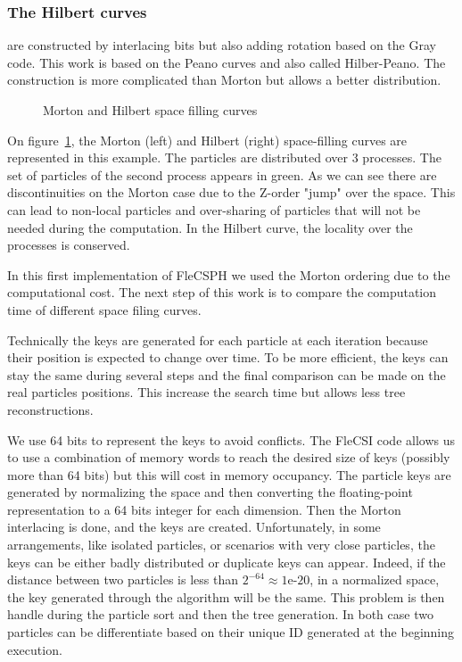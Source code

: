 \subsubsection*{The Hilbert curves} \cite{sagan2012space} are constructed by interlacing bits but also adding rotation based on the Gray code.
This work is based on the Peano curves and also called Hilber-Peano. 
The construction is more complicated than Morton but allows a better distribution. 

\begin{figure}[t!]
\centering

\caption{Morton and Hilbert space filling curves}
\label{fig:space_filling}
\end{figure}

On figure~\ref{fig:space_filling}, the Morton (left) and Hilbert (right) space-filling curves are represented in this example.
The particles are distributed over 3 processes. 
The set of particles of the second process appears in green. 
As we can see there are discontinuities on the Morton case due to the Z-order "jump" over the space. 
This can lead to non-local particles and over-sharing of particles that will not be needed during the computation.
In the Hilbert curve, the locality over the processes is conserved.

In this first implementation of FleCSPH we used the Morton ordering due to the computational cost. 
The next step of this work is to compare the computation time of different space filing curves. 

Technically the keys are generated for each particle at each iteration because their position is expected to change over time. 
To be more efficient, the keys can stay the same during several steps and the final comparison can be made on the real particles positions. 
This increase the search time but allows less tree reconstructions.

We use 64 bits to represent the keys to avoid conflicts.
The FleCSI code allows us to use a combination of memory words to reach the desired size of keys (possibly more than 64 bits) but this will cost in memory occupancy. 
The particle keys are generated by normalizing the space and then converting the floating-point representation to a 64 bits integer for each dimension. 
Then the Morton interlacing is done, and the keys are created. 
Unfortunately, in some arrangements, like isolated particles, or scenarios with very close particles, the keys can be either badly distributed or duplicate keys can appear. 
Indeed, if the distance between two particles is less than $2^{-64} \approx 1$e-$20$, in a normalized space, the key generated through the algorithm will be the same. 
This problem is then handle during the particle sort and then the tree generation. 
In both case two particles can be differentiate based on their unique ID generated at the beginning execution. 


